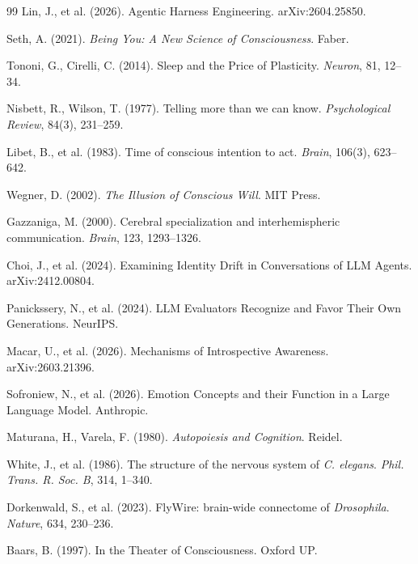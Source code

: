\documentclass[11pt]{article}
\begin{document}
{\begin{thebibliography}{99}
Lin, J., et al. (2026). Agentic Harness Engineering. arXiv:2604.25850.

Seth, A. (2021). \emph{Being You: A New Science of Consciousness}. Faber.

Tononi, G., Cirelli, C. (2014). Sleep and the Price of Plasticity. \emph{Neuron}, 81, 12--34.

Nisbett, R., Wilson, T. (1977). Telling more than we can know. \emph{Psychological Review}, 84(3), 231--259.

Libet, B., et al. (1983). Time of conscious intention to act. \emph{Brain}, 106(3), 623--642.

Wegner, D. (2002). \emph{The Illusion of Conscious Will}. MIT Press.

Gazzaniga, M. (2000). Cerebral specialization and interhemispheric communication. \emph{Brain}, 123, 1293--1326.

Choi, J., et al. (2024). Examining Identity Drift in Conversations of LLM Agents. arXiv:2412.00804.

Panickssery, N., et al. (2024). LLM Evaluators Recognize and Favor Their Own Generations. NeurIPS.

Macar, U., et al. (2026). Mechanisms of Introspective Awareness. arXiv:2603.21396.

Sofroniew, N., et al. (2026). Emotion Concepts and their Function in a Large Language Model. Anthropic.

Maturana, H., Varela, F. (1980). \emph{Autopoiesis and Cognition}. Reidel.

White, J., et al. (1986). The structure of the nervous system of \emph{C. elegans}. \emph{Phil. Trans. R. Soc. B}, 314, 1--340.

Dorkenwald, S., et al. (2023). FlyWire: brain-wide connectome of \emph{Drosophila}. \emph{Nature}, 634, 230--236.

Baars, B. (1997). In the Theater of Consciousness. Oxford UP.


\end{thebibliography}}
\end{document}
